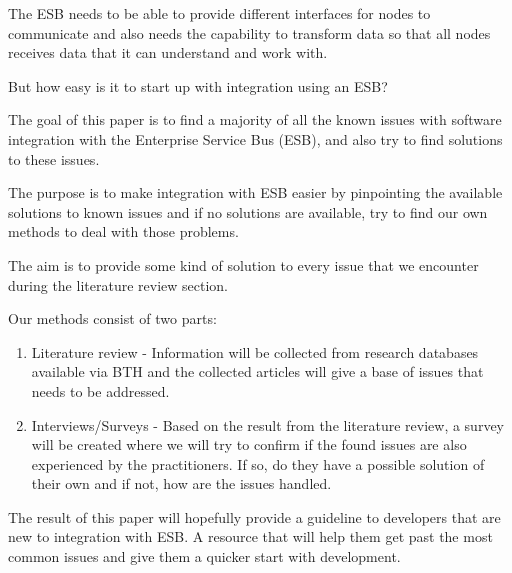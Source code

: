 \documentclass{llncs}
\begin{document}
The ESB needs to be able to provide different interfaces for nodes to communicate and also needs the capability to transform data so that all nodes receives data that it can understand and work with.

But how easy is it to start up with integration using an ESB?

The goal of this paper is to find a majority of all the known issues with software integration with the Enterprise Service Bus (ESB), and also try to find solutions to these issues.

The purpose is to make integration with ESB easier by pinpointing the available solutions to known issues and if no solutions are available, try to find our own methods to deal with those problems.

The aim is to provide some kind of solution to every issue that we encounter during the literature review section.

Our methods consist of two parts:
\begin{enumerate}
 \item Literature review - Information will be collected from research databases available via BTH and the collected articles will give a base of issues that needs to be addressed.
 \item Interviews/Surveys - Based on the result from the literature review, a survey will be created where we will try to confirm if the found issues are also experienced by the practitioners. If so, do they have a possible solution of their own and if not, how are the issues handled.
\end{enumerate}
The result of this paper will hopefully provide a guideline to developers that are new to integration with ESB. A resource that will help them get past the most common issues and give them a quicker start with development.
\end{document}
